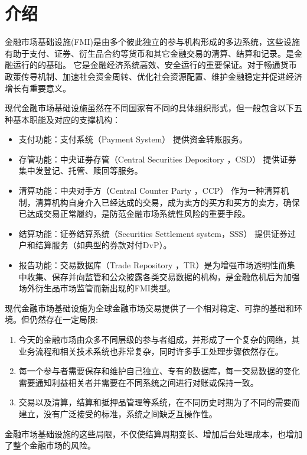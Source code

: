 \section{介绍}

金融市场基础设施(FMI)是由多个彼此独立的参与机构形成的多边系统，这些设施有助于支付、证券、衍生品合约等货币和其它金融交易的清算、结算和记录。是金融运行的的基础。
它是金融经济系统高效、安全运行的重要保证。对于畅通货币政策传导机制、加速社会资金周转、优化社会资源配置、维护金融稳定并促进经济增长有重要意义。

现代金融市场基础设施虽然在不同国家有不同的具体组织形式，但一般包含以下五种基本职能及对应的支撑机构：

\begin{itemize}
    \item [\dag] 支付功能：支付系统（Payment System） 提供资金转账服务。
    \item [\dag] 存管功能：中央证券存管（Central Securities Depository ，CSD） 提供证券集中发登记、托管、赎回等服务。
    \item [\dag] 清算功能：中央对手方（Central Counter Party ，CCP） 作为一种清算机制，清算机构自身介入已经达成的交易，成为卖方的买方和买方的卖方，确保已达成交易正常履约，是防范金融市场系统性风险的重要手段。
    \item [\dag] 结算功能：证券结算系统（Securities Settlement system，SSS） 提供证券过户和结算服务（如典型的券款对付DvP）。
    \item [\dag] 报告功能：交易数据库（Trade Repository ，TR）是为增强市场透明性而集中收集、保存并向监管和公众披露各类交易数据的机构，是金融危机后为加强场外衍生品市场监管而新出现的FMI类型。
\end{itemize}

现代金融市场基础设施为全球金融市场交易提供了一个相对稳定、可靠的基础和环境。但仍然存在一定局限: 
\begin{enumerate}
    \item 今天的金融市场由众多不同层级的参与者组成，并形成了一个复杂的网络，其业务流程和相关技术系统也非常复杂，同时许多手工处理步骤依然存在。
    \item 每一个参与者需要保存和维护自己独立、专有的数据库，每一交易数据的变化需要通知利益相关者并需要在不同系统之间进行对账或保持一致。
    \item 交易以及清算，结算和抵押品管理等系统，在不同历史时期为了不同的需要而建立，没有广泛接受的标准，系统之间缺乏互操作性。
\end{enumerate}
金融市场基础设施的这些局限，不仅使结算周期变长、增加后台处理成本，也增加了整个金融市场的风险。

